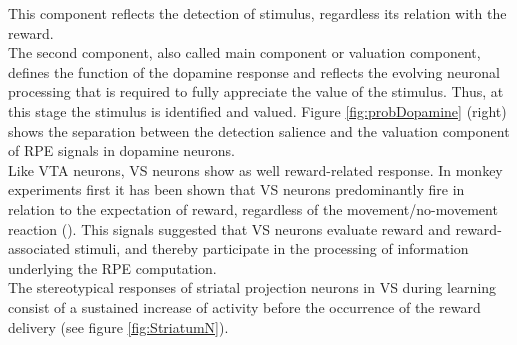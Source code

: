 This component reflects the detection of stimulus, regardless its relation with the reward.\\The second component, also called main component or valuation component, defines the function of the dopamine response and reflects the evolving neuronal processing that is required to fully appreciate the value of the stimulus. Thus, at this stage the stimulus is identified and valued. Figure \ref{fig:probDopamine} (right) shows the separation between the detection salience and the valuation component of RPE signals in dopamine neurons.\\Like VTA neurons, VS neurons show as well reward-related response. In monkey experiments first it has been shown that VS neurons predominantly fire in relation to the expectation of reward, regardless of the movement/no-movement reaction (\cite{Schultz1992}). This signals suggested that VS neurons evaluate reward and reward-associated stimuli, and thereby participate in the processing of information underlying the RPE computation.\\The stereotypical responses of striatal projection neurons in VS during learning consist of a sustained increase of activity before the occurrence of the reward delivery (see figure \ref{fig:StriatumN}).
